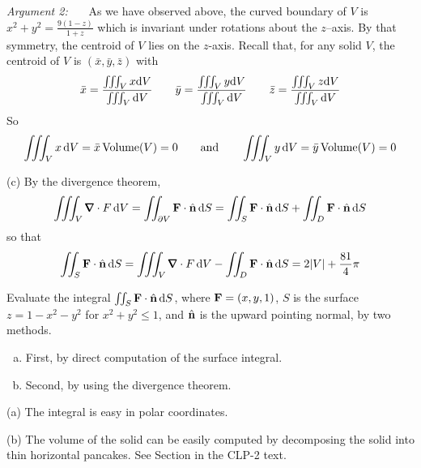 \begin{solution}
\emph{Argument 2:} \ \ \ As we have observed above, the
curved boundary of $V$ is $x^2+y^2 = \frac{9(1-z)}{1+z}$ which
is invariant under rotations about the $z$--axis. By that symmetry, the 
centroid of $V$ lies on the $z$-axis. Recall that, for any solid $V$,
the centroid of $V$ is $(\bar x,\bar y,\bar z)$ with
\begin{equation*}
\bar x = \frac{\iiint_V x \mathrm{d}V}{\iiint_V \mathrm{d}V}\qquad
\bar y = \frac{\iiint_V y \mathrm{d}V}{\iiint_V \mathrm{d}V}\qquad
\bar z = \frac{\iiint_V z \mathrm{d}V}{\iiint_V \mathrm{d}V}
\end{equation*}
So
\begin{equation*}
\iiint_V x\,\mathrm{d}V = \bar x\, \text{Volume}(V) =0 \qquad\text{and}\qquad
\iiint_V y\,\mathrm{d}V = \bar y\,  \text{Volume}(V) =0 
\end{equation*}

(c)
By the divergence theorem,
\begin{equation*}
\tripInt_V\vnabla\cdot F\,\dee{V}
=\dblInt_{\partial V}\vF\cdot \hn\,\dee{S}
=\dblInt_S\vF\cdot \hn\,\dee{S}
+\dblInt_D\vF\cdot \hn\,\dee{S}
\end{equation*}
so that
\begin{equation*}
\dblInt_S\vF\cdot \hn\,\dee{S}
=\tripInt_V\vnabla\cdot F\,\dee{V}
-\dblInt_D\vF\cdot \hn\,\dee{S}
=2|V|+\frac{81}{4}\pi
\end{equation*}
\end{solution}

\goodbreak
\begin{question}
Evaluate the integral $\iint_S\mathbf{F}\cdot \hat{\mathbf{n}}\,\mathrm{d}S$,
where $\mathbf{F}=(x,y,1)$, $S$ is the surface $z=1-x^2-y^2$ 
for $x^2+y^2\le 1$, and $\hat{\mathbf{n}}$ is the upward pointing normal, by two methods.
\begin{enumerate}[(a)]
\item
First, by direct computation of the surface integral.
\item
Second, by using the divergence theorem.
\end{enumerate}
\end{question}

\begin{hint} 
(a) The integral is easy in polar coordinates.

(b) The volume of the solid can be easily computed by decomposing the solid
into thin horizontal pancakes. See Section 
in the CLP-2 text.

\end{hint}

